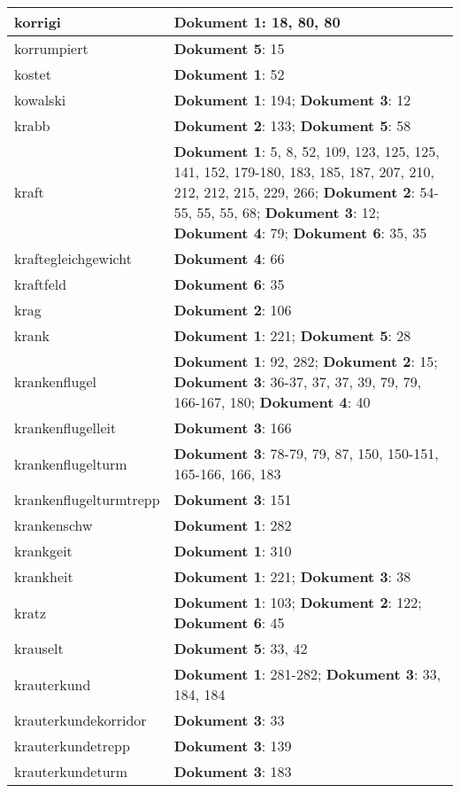 \documentclass[a5paper]{article}
\begin{document}
\begin{longtable}[l]{|l|p{3in}|}
\hline
korrigi & \textbf{Dokument 1}: 18, 80, 80 \\
\hline
korrumpiert & \textbf{Dokument 5}: 15 \\
\hline
kostet & \textbf{Dokument 1}: 52 \\
\hline
kowalski & \textbf{Dokument 1}: 194; \textbf{Dokument 3}: 12 \\
\hline
krabb & \textbf{Dokument 2}: 133; \textbf{Dokument 5}: 58 \\
\hline
kraft & \textbf{Dokument 1}: 5, 8, 52, 109, 123, 125, 125, 141, 152, 179-180, 183, 185, 187, 207, 210, 212, 212, 215, 229, 266; \textbf{Dokument 2}: 54-55, 55, 55, 68; \textbf{Dokument 3}: 12; \textbf{Dokument 4}: 79; \textbf{Dokument 6}: 35, 35 \\
\hline
kraftegleichgewicht & \textbf{Dokument 4}: 66 \\
\hline
kraftfeld & \textbf{Dokument 6}: 35 \\
\hline
krag & \textbf{Dokument 2}: 106 \\
\hline
krank & \textbf{Dokument 1}: 221; \textbf{Dokument 5}: 28 \\
\hline
krankenflugel & \textbf{Dokument 1}: 92, 282; \textbf{Dokument 2}: 15; \textbf{Dokument 3}: 36-37, 37, 37, 39, 79, 79, 166-167, 180; \textbf{Dokument 4}: 40 \\
\hline
krankenflugelleit & \textbf{Dokument 3}: 166 \\
\hline
krankenflugelturm & \textbf{Dokument 3}: 78-79, 79, 87, 150, 150-151, 165-166, 166, 183 \\
\hline
krankenflugelturmtrepp & \textbf{Dokument 3}: 151 \\
\hline
krankenschw & \textbf{Dokument 1}: 282 \\
\hline
krankgeit & \textbf{Dokument 1}: 310 \\
\hline
krankheit & \textbf{Dokument 1}: 221; \textbf{Dokument 3}: 38 \\
\hline
kratz & \textbf{Dokument 1}: 103; \textbf{Dokument 2}: 122; \textbf{Dokument 6}: 45 \\
\hline
krauselt & \textbf{Dokument 5}: 33, 42 \\
\hline
krauterkund & \textbf{Dokument 1}: 281-282; \textbf{Dokument 3}: 33, 184, 184 \\
\hline
krauterkundekorridor & \textbf{Dokument 3}: 33 \\
\hline
krauterkundetrepp & \textbf{Dokument 3}: 139 \\
\hline
krauterkundeturm & \textbf{Dokument 3}: 183 \\

\end{longtable}
\end{document}
